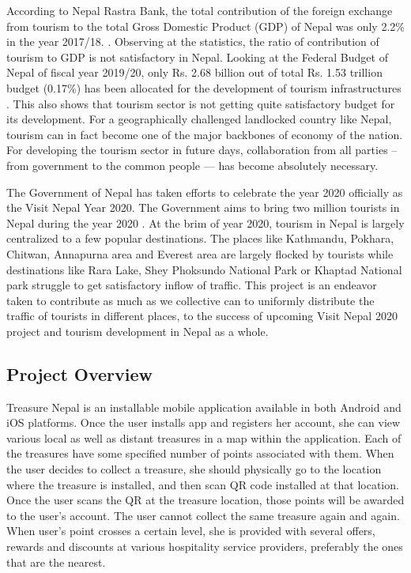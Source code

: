 \documentclass[12pt, a4paper, oneside]{article}
\begin{document}
According to Nepal Rastra Bank, the total contribution of the foreign exchange from tourism to the total Gross Domestic Product (GDP) of Nepal was only 2.2\% in the year 2017/18. \cite{tourismstats}. Observing at the statistics, the ratio of contribution of tourism to GDP is not satisfactory in Nepal. Looking at the Federal Budget of Nepal of fiscal year 2019/20,  only Rs. 2.68 billion out of total Rs. 1.53 trillion budget (0.17\%) has been allocated for the development of tourism infrastructures \cite{budget}. This also shows that tourism sector is not getting quite satisfactory budget for its development. For a geographically challenged landlocked country like Nepal, tourism can in fact become one of the major backbones of economy of the nation. For developing the tourism sector in future days, collaboration from all parties -- from government to the common people --- has become absolutely necessary. 

The Government of Nepal has taken efforts to celebrate the year 2020 officially as the Visit Nepal Year 2020. The Government aims to bring two million tourists in Nepal during the year 2020 \cite{visitnepal}. At the brim of year 2020, tourism in Nepal is largely centralized to a few popular destinations. The places like Kathmandu, Pokhara, Chitwan, Annapurna area and Everest area are largely flocked by tourists while destinations like Rara Lake, Shey Phoksundo National Park or Khaptad National park struggle to get satisfactory inflow of traffic. This project is an endeavor taken to contribute as much as we collective can to uniformly distribute the traffic of tourists in different places, to the success of upcoming Visit Nepal 2020 project and tourism development in Nepal as a whole.

\subsection{Project Overview}
Treasure Nepal is an installable mobile application available in both Android and iOS platforms. Once the user installs app and registers her account, she can view various local as well as distant treasures in a map within the application. Each of the treasures have some specified number of points associated with them. When the user decides to collect a treasure, she should physically go to the location where the treasure is installed, and then scan QR code installed at that location. Once the user scans the QR at the treasure location, those points will be awarded to the user's account. The user cannot collect the same treasure again and again. When user's point crosses a certain level, she is provided with several offers, rewards and discounts at various hospitality service providers, preferably the ones that are the nearest.
\end{document}
